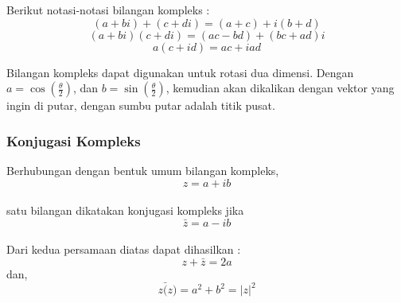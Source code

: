 Berikut notasi-notasi bilangan kompleks :
\[
 (a + bi) + (c + di) = (a+c) + i(b+d)
\]
\[
 (a + bi)(c + di) = (ac−bd) + (bc+ad)i
\]
\[
 a(c + id) = ac + iad
\]\cite{kuipers:1999}

Bilangan kompleks dapat digunakan untuk rotasi dua dimensi. Dengan \(a = \cos (\frac{\theta}{2})\), dan \(b = \sin(\frac{\theta}{2})\), kemudian akan dikalikan dengan vektor yang ingin di putar, dengan sumbu putar adalah titik pusat.


\subsubsection{Konjugasi Kompleks}
Berhubungan dengan bentuk umum bilangan kompleks,
\[
	z = a + ib
\]\cite{kuipers:1999}\\
satu bilangan dikatakan konjugasi kompleks jika
\[
	\bar{z} = a - ib
\]\cite{kuipers:1999}\\
Dari kedua persamaan diatas dapat dihasilkan :
\[
	z + \bar{z} = 2a
\]dan,
\[
	z \bar(z) = a^2 +b^2 = |z|^2
\]\cite{kuipers:1999}

